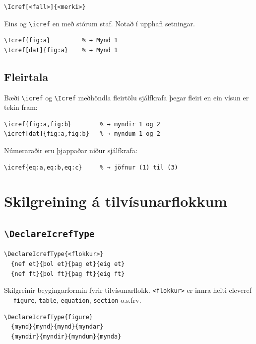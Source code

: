 \documentclass{article}
\begin{document}
\begin{lstlisting}
\Icref[<fall>]{<merki>}
\end{lstlisting}

Eins og \verb|\icref| en með stórum staf. Notað í upphafi setningar.

\begin{lstlisting}
\Icref{fig:a}         % → Mynd 1
\Icref[dat]{fig:a}    % → Mynd 1
\end{lstlisting}

\subsection{Fleirtala}

Bæði \verb|\icref| og \verb|\Icref| meðhöndla fleirtölu sjálfkrafa þegar
fleiri en ein vísun er tekin fram:

\begin{lstlisting}
\icref{fig:a,fig:b}        % → myndir 1 og 2
\icref[dat]{fig:a,fig:b}   % → myndum 1 og 2
\end{lstlisting}

Númeraraðir eru þjappaðar niður sjálfkrafa:

\begin{lstlisting}
\icref{eq:a,eq:b,eq:c}     % → jöfnur (1) til (3)
\end{lstlisting}

\section{Skilgreining á tilvísunarflokkum}

\subsection{\texttt{\textbackslash DeclareIcrefType}}

\begin{lstlisting}
\DeclareIcrefType{<flokkur>}
  {nef et}{þol et}{þag et}{eig et}
  {nef ft}{þol ft}{þag ft}{eig ft}
\end{lstlisting}

Skilgreinir beygingarformin fyrir tilvísunarflokk. \texttt{<flokkur>}
er innra heiti cleveref — \texttt{figure}, \texttt{table},
\texttt{equation}, \texttt{section} o.s.frv.

\begin{lstlisting}
\DeclareIcrefType{figure}
  {mynd}{mynd}{mynd}{myndar}
  {myndir}{myndir}{myndum}{mynda}
\end{lstlisting}
\end{document}
